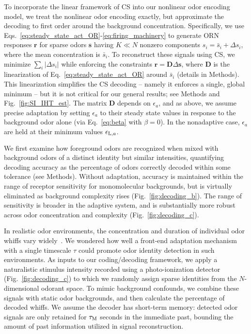 \documentclass[10pt,prl,aps,showpacs,twocolumn,unsortedaddress,showkeys,linenumbers]{revtex4-1}
\begin{document}
To incorporate the linear framework of CS into our nonlinear odor encoding model, we treat the nonlinear odor encoding exactly, but approximate the decoding to first order around the background concentration. Specifically, we use Eqs.~\ref{eq:steady_state_act_OR}-\ref{eq:firing_machinery} to generate ORN responses $\mathbf r$ for sparse odors $\mathbf s$ having $K \ll N$ nonzero components $s_i = \bar{s}_i + \Delta s_i$, where the mean concentration is $\bar{s}_i$. To reconstruct these signals using CS, we minimize $\sum_i |\Delta s_i|$ while enforcing the constraints $\mathbf r = \mathbf D \Delta \mathbf s$, where $\mathbf D$ is the linearization of Eq.~\ref{eq:steady_state_act_OR} around $\bar{s}_i$ (details in Methods). This linearization simplifies the CS decoding -- namely it enforces a single, global minimum  -- but it is not critical for our general results; see Methods and Fig.~\ref{fig:SI_IHT_est}. The matrix $\mathbf D$ depends on $\epsilon_a$, and as above, we assume precise adaptation by setting $\epsilon_a$ to their steady state values in response to the background odor alone (via Eq.~\ref{eq:beta} with $\beta=0$). In the nonadaptive case, $\epsilon_a$ are held at their minimum values $\epsilon_{\textup L, a}$. 

We first examine how foreground odors are recognized when mixed with background odors of a distinct identity but similar intensities, quantifying decoding accuracy as the percentage of odors correctly decoded within some tolerance (see Methods). Without adaptation, accuracy is maintained within the range of receptor sensitivity for monomolecular backgrounds, but is virtually eliminated as background complexity rises (Fig.~\ref{fig:decoding_b}). The range of sensitivity is broader in the adaptive system, and is substantially more robust across odor concentration and complexity (Fig.~\ref{fig:decoding_c}). 

In realistic odor environments, the concentration and duration of individual odor whiffs vary widely~\cite{celani}. We wondered how well a front-end adaptation mechanism with a single timescale $\tau$ could promote odor identity detection in such environments. As inputs to our coding/decoding framework, we apply a naturalistic stimulus intensity recorded using a photo-ionization detector~\cite{srinivas_elife} (Fig.~\ref{fig:decoding_c}) to which we randomly assign sparse identities from the $N$-dimensional odorant space. To mimic background confounds, we combine these signals with static odor backgrounds, and then calculate the percentage of decoded whiffs. We assume the decoder has short-term memory: detected odor signals are only retained for $\tau_{\textup {M}}$ seconds in the immediate past, {\color {blue} 
bounding the amount of past information utilized in signal reconstruction. 
}
\end{document}
